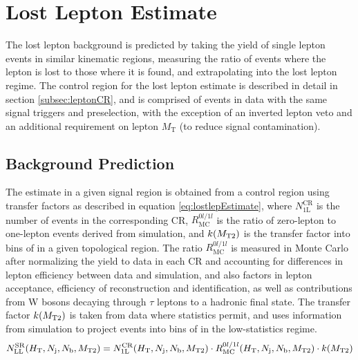 \section{Lost Lepton Estimate}
\label{sec:lostlep}

The lost lepton background is predicted by taking the yield of single lepton events in similar kinematic regions, measuring the ratio of events where the lepton is lost to those where it is found, and extrapolating into the lost lepton regime. The control region for the lost lepton estimate is described in detail in section \ref{subsec:leptonCR}, and is comprised of events in data with the same signal triggers and preselection, with the exception of an inverted lepton veto and an additional requirement on lepton $M_{\mathrm{T}}$ (to reduce signal contamination). 

\subsection{Background Prediction}
\label{subsec:lostlepPrediction}

The estimate in a given signal region is obtained from a control region using transfer factors as described in equation \ref{eq:lostlepEstimate}, where $N_{\mathrm{1L}}^{\mathrm{CR}}$ is the number of events in the corresponding CR, $R_{\mathrm{MC}}^{0l/1l}$ is the ratio of zero-lepton to one-lepton events derived from simulation, and $k(M_{\mathrm{T2}})$ is the transfer factor into bins of \mttwo in a given topological region. The ratio $R_{\mathrm{MC}}^{0l/1l}$ is measured in Monte Carlo after normalizing the yield to data in each CR and accounting for differences in lepton efficiency between data and simulation, and also factors in lepton acceptance, efficiency of reconstruction and identification, as well as contributions from W bosons decaying through $\tau$ leptons to a hadronic final state. The \mttwo transfer factor $k(M_{\mathrm{T2}})$ is taken from data where statistics permit, and uses information from simulation to project events into bins of \mttwo in the low-statistics regime.
\begin{equation}
	N_{\mathrm{LL}}^{\mathrm{SR}}(H_{\mathrm{T}},N_\mathrm{j},N_\mathrm{b},M_{\mathrm{T2}}) = N_{\mathrm{1L}}^{\mathrm{CR}}(H_{\mathrm{T}},N_\mathrm{j},N_\mathrm{b},M_{\mathrm{T2}}) \cdot R_{\mathrm{MC}}^{0l/1l}(H_{\mathrm{T}},N_\mathrm{j},N_\mathrm{b},M_{\mathrm{T2}}) \cdot k(M_{\mathrm{T2}})
	\label{eq:lostlepEstimate}
\end{equation}

